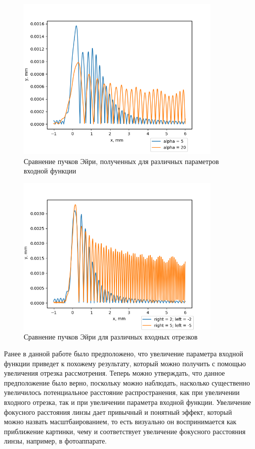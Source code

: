 {    \begin{figure}[H]
        \begin{center}
            \includegraphics[width=10cm]{plots/ai_param_comparison}
            \caption{Сравнение пучков Эйри, полученных для различных параметров входной функции}
            \label{ai_param_comparison}
        \end{center}
    \end{figure}

    \begin{figure}[H]
        \begin{center}
            \includegraphics[width=10cm]{plots/ai_input_comparison}
            \caption{Сравнение пучков Эйри для различных входных отрезков}
            \label{ai_input_comparison}
        \end{center}

    \end{figure}

    Ранее в данной работе было предположено, что увеличение параметра входной функции приведет к похожему результату,
    который можно получить с помощью увеличения отрезка рассмотрения.
    Теперь можно утверждать, что данное предположение было верно, поскольку можно наблюдать,
    насколько существенно увеличилось потенциальное расстояние распространения,
    как при увеличении входного отрезка, так и при увеличении параметра входной функции.
    Увеличение фокусного расстояния линзы дает привычный и понятный эффект,
    который можно назвать масштбаированием, то есть визуально он воспринимается как приближение картинки,
    чему и соответствует увеличение фокусного расстояния линзы, например, в фотоаппарате.

}

